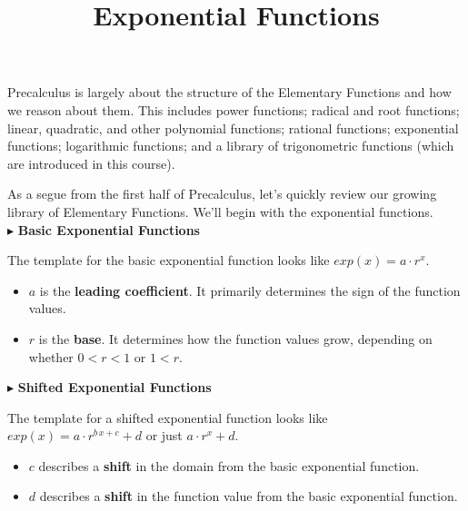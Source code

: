 \documentclass{ximera}
\title{Exponential Functions}
\begin{document}
\begin{abstract}
\end{abstract}
\maketitle




Precalculus is largely about the structure of the Elementary Functions and how we reason about them.  This includes power functions; radical and root functions; linear, quadratic, and other polynomial functions; rational functions; exponential functions; logarithmic functions; and a library of trigonometric functions (which are introduced in this course).

As a segue from the first half of Precalculus, let's quickly review our growing library of Elementary Functions. We'll begin with the exponential functions.   \\





$\blacktriangleright$ \textbf{\textcolor{blue!55!black}{Basic Exponential Functions}} 


The template for the basic exponential function looks like \textbf{\textcolor{blue!55!black}{$exp(x) = a \cdot r^x$}}. 

\begin{itemize}
\item $a$ is the \textbf{\textcolor{purple!85!blue}{leading coefficient}}.  It primarily determines the sign of the function values.
\item $r$ is the \textbf{\textcolor{purple!85!blue}{base}}. It determines how the function values grow, depending on whether $0 < r < 1$ or $1 < r$.
\end{itemize}





$\blacktriangleright$ \textbf{\textcolor{blue!55!black}{Shifted Exponential Functions}}   

The template for a shifted exponential function looks like \textbf{\textcolor{blue!55!black}{$exp(x) = a \cdot r^{b \, x + c} + d$}}  or just \textbf{\textcolor{blue!55!black}{$a \cdot r^x + d$}}. 

\begin{itemize}
\item $c$ describes a \textbf{\textcolor{purple!85!blue}{shift}} in the domain from the basic exponential function.  
\item $d$ describes a \textbf{\textcolor{purple!85!blue}{shift}} in the function value from the basic exponential function. 
\end{itemize}
\end{document}
